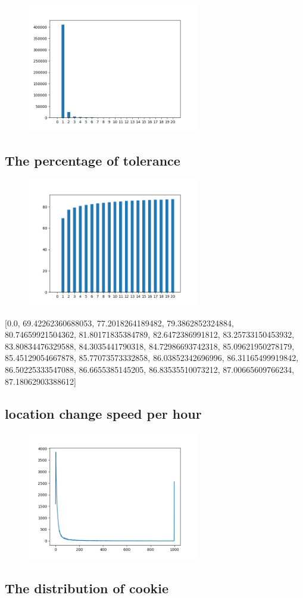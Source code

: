 \documentclass[10pt, conference, compsocconf]{IEEEtran}
\begin{document}
\begin{figure}[H]\centering\includegraphics[width=75mm,scale=0.5]{BasedonClientIDnumberofusersfingerprint}\end{figure}\subsection{The percentage of tolerance}
\begin{figure}[H]\centering\includegraphics[width=75mm,scale=0.5]{BasedonClientIDtolerance}\end{figure}[0.0, 69.42262360688053, 77.2018264189482, 79.3862852324884, 80.74659921504362, 81.80171835384789, 82.6472386991812, 83.25733150453932, 83.80834476329588, 84.3035441790318, 84.72986693742318, 85.09621950278179, 85.45129054667878, 85.77073573332858, 86.03852342696996, 86.31165499919842, 86.50225333547088, 86.6655385145205, 86.83535510073212, 87.00665609766234, 87.18062903388612]\subsection{location change speed per hour}
\begin{figure}[H]\centering\includegraphics[width=75mm,scale=0.5]{BasedonClientIDlocationchange}\end{figure}\subsection{The distribution of cookie}
\end{document}
